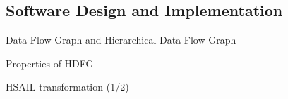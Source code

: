 \documentclass{beamer}
\begin{document}
\begin{CJK}{UTF8}{bkai}
    \subsection{Software Design and Implementation}
    \begin{frame}{Data Flow Graph and Hierarchical Data Flow Graph}
        \begin{figure}[!ht]
            \begin{center}
                \hfill
            \end{center}
            \label{fig:dfg}
        \end{figure}
    \end{frame}
    \begin{frame}{Properties of HDFG}
        
    \end{frame}
    \begin{frame}{HSAIL transformation (1/2)}
        

\end{frame}
\end{CJK}
\end{document}
